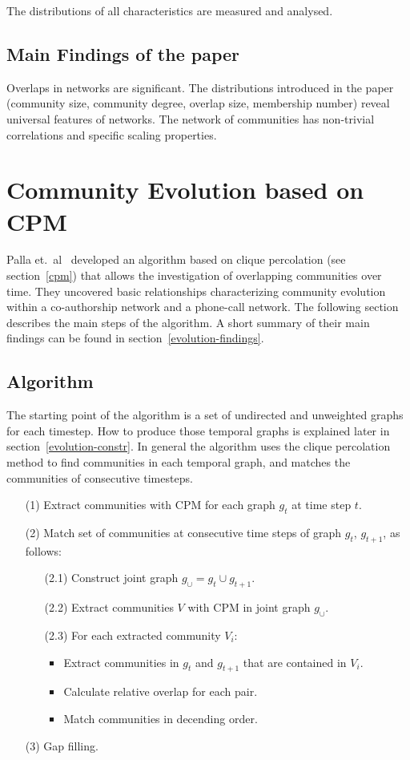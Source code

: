 \documentclass[runningheads,a4paper]{llncs}
\begin{document}
The distributions of all characteristics are measured and analysed.

\subsection{Main Findings of the paper}
Overlaps in networks are significant. The distributions introduced in the paper (community size, community degree, overlap size, membership number) reveal universal features of networks. The network of communities has non-trivial correlations and specific scaling properties.~\cite{palla2005uncovering}

\section{Community Evolution based on CPM}
\label{evolution}
Palla et.~al~\cite{palla2007quantifying} developed an algorithm based on clique percolation (see section~\ref{cpm}) that allows the investigation of overlapping communities over time. They uncovered basic relationships characterizing community evolution within a co-authorship network and a phone-call network. The following section describes the main steps of the algorithm. A short summary of their main findings can be found in section~\ref{evolution-findings}.

\subsection{Algorithm}
\label{evolution-algo}
The starting point of the algorithm is a set of undirected and unweighted  graphs for each timestep.
How to produce those temporal graphs is explained later in section~\ref{evolution-constr}.
In general the algorithm uses the clique percolation method to find communities in each temporal graph, and matches the communities of consecutive timesteps.

\begin{enumerate}
\small
\item[(1)] Extract communities with CPM for each graph $g_t$ at time step $t$.
\item[(2)] Match set of communities at consecutive time steps of graph $g_t$, $g_{t+1}$, as follows:
	\begin{enumerate}
		\item[(2.1)] Construct joint graph $g_{\cup}=g_t \cup g_{t+1}$.
		\item[(2.2)] Extract communities $V$ with CPM in joint graph $g_{\cup}$.
		\item[(2.3)] For each extracted community $V_i$: 
		\begin{itemize}
			\item Extract communities in $g_t$ and $g_{t+1}$ that are contained in $V_i$.
			\item Calculate relative overlap for each pair.
			\item Match communities in decending order.
		\end{itemize}
	\end{enumerate}
\item[(3)] Gap filling.
\end{enumerate}
\end{document}
